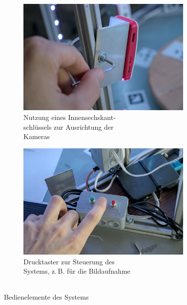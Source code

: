 \documentclass[./00PhotoBox.tex]{subfiles}
\begin{document}
\begin{figure}[htbp]
    \centering
    \begin{subfigure}{0.48\textwidth}
        \includegraphics[width=0.95\textwidth]{img/9_anleitung/innensechs.jpg}
        \caption{Nutzung eines Innensechskant-\\schlüssels zur Ausrichtung der\\Kameras}
        \label{img:innensechs}
    \end{subfigure}
    \begin{subfigure}{0.48\textwidth}
        \includegraphics[width=0.95\textwidth]{img/9_anleitung/taster.jpg}
        \caption{Drucktaster zur Steuerung des\\Systems, z.\,B. für die  Bildaufnahme\\~}
        \label{img:taster}
    \end{subfigure}
    \caption{Bedienelemente des Systems}
\end{figure}
\end{document}
